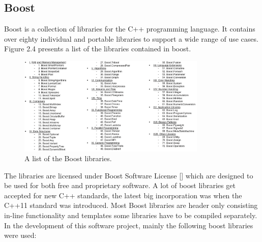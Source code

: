 \subsection{Boost}
Boost is a collection of libraries for the C++ programming language. It contains over eighty individual and portable libraries to support a wide range of use cases. Figure 2.4 presents a list of the libraries contained in boost.
\begin{figure}[h]
\centering
      \includegraphics[width=0.8\textwidth]{boost}
        \caption{A list of the Boost libraries.}
\end{figure}
The libraries are licensed under Boost Software License [] which are designed to be used for both free and proprietary software. A lot of boost libraries get accepted for new C++ standards, the latest big incorporation was when the C++11 standard was introduced. Most Boost libraries are header only consisting in-line functionality and templates some libraries have to be compiled separately.\\
In the development of this software project, mainly the following boost libraries were used:
